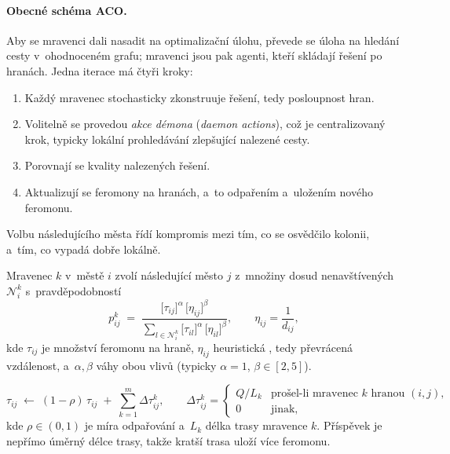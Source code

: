 \documentclass[11pt,a4paper]{article}
\theoremstyle{definition}
\begin{document}
\paragraph{Obecné schéma ACO.} Aby se mravenci dali nasadit na optimalizační úlohu, převede
se úloha na hledání cesty v~ohodnoceném grafu; mravenci jsou pak agenti, kteří skládají
řešení po hranách. Jedna iterace má čtyři kroky:
\begin{enumerate}
\item Každý mravenec stochasticky zkonstruuje řešení, tedy posloupnost hran.
\item Volitelně se provedou \emph{akce démona} (\emph{daemon actions}), což je centralizovaný
  krok, typicky lokální prohledávání zlepšující nalezené cesty.
\item Porovnají se kvality nalezených řešení.
\item Aktualizují se feromony na hranách, a~to odpařením a~uložením nového feromonu.
\end{enumerate}

Volbu následujícího města řídí kompromis mezi tím, co se osvědčilo kolonii, a~tím, co vypadá
dobře lokálně.

\begin{defbox}
Mravenec $k$ v~městě $i$ zvolí následující město $j$ z~množiny dosud
nenavštívených $\mathcal{N}_i^k$ s~pravděpodobností
\[
p_{ij}^{k} \;=\;
\frac{\big[\tau_{ij}\big]^{\alpha}\,\big[\eta_{ij}\big]^{\beta}}
     {\sum_{l \in \mathcal{N}_i^k}\big[\tau_{il}\big]^{\alpha}\,\big[\eta_{il}\big]^{\beta}},
\qquad \eta_{ij} = \frac{1}{d_{ij}},
\]
kde $\tau_{ij}$ je množství feromonu na hraně, $\eta_{ij}$ heuristická
, tedy převrácená vzdálenost, a~$\alpha, \beta$ váhy obou vlivů
(typicky $\alpha = 1$, $\beta \in [2,5]$).
\end{defbox}

\begin{defbox}
\[
\tau_{ij} \;\gets\; (1-\rho)\,\tau_{ij} \;+\; \sum_{k=1}^{m} \Delta\tau_{ij}^{k},
\qquad
\Delta\tau_{ij}^{k} =
\begin{cases}
Q/L_k & \text{prošel-li mravenec } k \text{ hranou } (i,j),\\
0 & \text{jinak,}
\end{cases}
\]
kde $\rho \in (0,1)$ je míra odpařování a~$L_k$ délka trasy mravence $k$.
Příspěvek je nepřímo úměrný délce trasy, takže kratší trasa uloží více feromonu.
\end{defbox}
\end{document}
